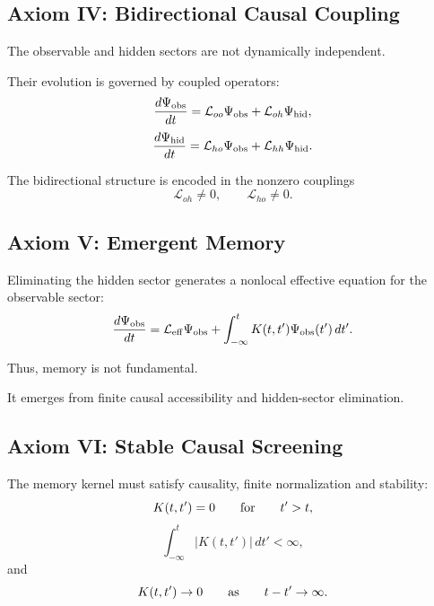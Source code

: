 \subsection{Axiom IV: Bidirectional Causal Coupling}

The observable and hidden sectors are not dynamically independent.

Their evolution is governed by coupled operators:
\begin{equation}
\frac{d\Psi_{\rm obs}}{dt}
=
\mathcal L_{oo}\Psi_{\rm obs}
+
\mathcal L_{oh}\Psi_{\rm hid},
\end{equation}
\begin{equation}
\frac{d\Psi_{\rm hid}}{dt}
=
\mathcal L_{ho}\Psi_{\rm obs}
+
\mathcal L_{hh}\Psi_{\rm hid}.
\end{equation}

The bidirectional structure is encoded in the nonzero couplings
\begin{equation}
\mathcal L_{oh}\neq 0,
\qquad
\mathcal L_{ho}\neq 0.
\end{equation}

\subsection{Axiom V: Emergent Memory}

Eliminating the hidden sector generates a nonlocal effective equation for the observable sector:
\begin{equation}
\frac{d\Psi_{\rm obs}}{dt}
=
\mathcal L_{\rm eff}\Psi_{\rm obs}
+
\int_{-\infty}^{t}
K(t,t')
\Psi_{\rm obs}(t')
\,dt'.
\end{equation}

Thus, memory is not fundamental.

It emerges from finite causal accessibility and hidden-sector elimination.

\subsection{Axiom VI: Stable Causal Screening}

The memory kernel must satisfy causality, finite normalization and stability:
\begin{equation}
K(t,t')=0
\qquad
{\rm for}
\qquad
t'>t,
\end{equation}
\begin{equation}
\int_{-\infty}^{t}
|K(t,t')|\,dt'
<
\infty,
\end{equation}
and
\begin{equation}
K(t,t')\rightarrow 0
\qquad
{\rm as}
\qquad
t-t'\rightarrow \infty.
\end{equation}

